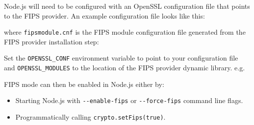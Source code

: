Node.js will need to be configured with an OpenSSL configuration file
that points to the FIPS provider. An example configuration file looks
like this:

\begin{Shaded}
\begin{Highlighting}[]




\end{Highlighting}
\end{Shaded}

where \texttt{fipsmodule.cnf} is the FIPS module configuration file
generated from the FIPS provider installation step:

\begin{Shaded}
\begin{Highlighting}[]
\end{Highlighting}
\end{Shaded}

Set the \texttt{OPENSSL\_CONF} environment variable to point to your
configuration file and \texttt{OPENSSL\_MODULES} to the location of the
FIPS provider dynamic library. e.g.

\begin{Shaded}
\begin{Highlighting}[]
 \OperatorTok{=}\NormalTok{/}\OperatorTok{\textless{}}\OperatorTok{\textgreater{}}
 \OperatorTok{=}\NormalTok{/}\OperatorTok{\textless{}}\OperatorTok{\textgreater{}}
\end{Highlighting}
\end{Shaded}

FIPS mode can then be enabled in Node.js either by:

\begin{itemize}
\tightlist
\item
  Starting Node.js with \texttt{-\/-enable-fips} or
  \texttt{-\/-force-fips} command line flags.
\item
  Programmatically calling \texttt{crypto.setFips(true)}.
\end{itemize}

